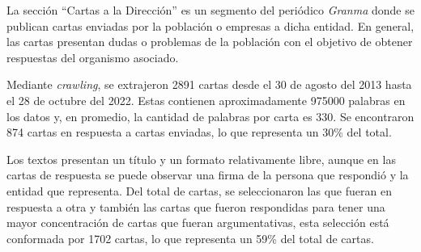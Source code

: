 \documentclass[a4paper,11pt,twocolumn,twoside]{article}
\begin{document}
La sección ``Cartas a la Dirección'' \cite{gallego2013cartas} es un segmento del periódico \textit{Granma} donde se publican
cartas enviadas por la población o empresas a dicha entidad. En general, las cartas 
presentan dudas o problemas de la población con el objetivo de obtener respuestas del organismo
asociado. 

Mediante \textit{crawling}, se extrajeron 2891 cartas desde el 30 de agosto del 2013 hasta el 28 de octubre del 2022. Estas 
contienen aproximadamente 975000 palabras en los datos y, en promedio, la cantidad de palabras por carta es 330.
Se encontraron 874 cartas en respuesta a cartas enviadas, lo que representa un 30\% del total. 

Los textos presentan un título y un formato relativamente libre, 
aunque en las cartas de respuesta se puede observar una firma de la persona que respondió y la entidad que 
representa. Del total de cartas, se seleccionaron las que fueran en respuesta a otra y también las 
cartas que fueron respondidas para tener una mayor concentración de cartas que fueran argumentativas, 
esta selección está conformada por 1702 cartas, lo que representa un 59\% del total de cartas.


\end{document}
